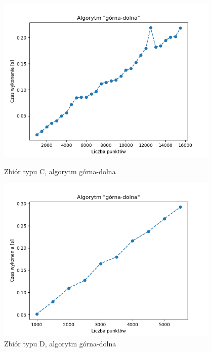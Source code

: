 \documentclass[11pt]{article}
\theoremstyle{remark} \newtheorem{definition}{def.}
\theoremstyle{definition} \newtheorem{twierdzenie}{tw.}
\begin{document}
\begin{figure}[]
    \centering
    \begin{minipage}{0.48\textwidth}
        \centering
        \includegraphics[width=0.95\textwidth]{../tests/prost-lowerupper.png} %
        \caption{Zbiór typu C, algorytm górna-dolna}
        \label{fig:prost-lowerupper}
    \end{minipage}\hfill
    \begin{minipage}{0.48\textwidth}
        \centering
        \includegraphics[width=0.95\textwidth]{../tests/kw-lowerupper.png} %
        \caption{Zbiór typu D, algorytm górna-dolna}
        \label{fig:kw-lowerupper}
    \end{minipage}
\end{figure}
\end{document}
